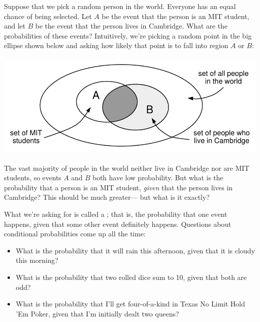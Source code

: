 \begin{problems}
\classproblems
{}
\end{problems}


Suppose that we pick a random person in the world.  Everyone has an
equal chance of being selected.  Let $A$ be the event that the person
is an MIT student, and let $B$ be the event that the person lives in
Cambridge.  What are the probabilities of these events?  Intuitively,
we're picking a random point in the big ellipse shown below and asking
how likely that point is to fall into region $A$ or $B$:
%
\begin{center}
\includegraphics[height=2in]{figures/cambridge-conditional}
\end{center}
%
The vast majority of people in the world neither live in Cambridge nor
are MIT students, so events $A$ and $B$ both have low probability.
But what is the probability that a person is an MIT student,
\textit{given} that the person lives in Cambridge?  This should be
much greater--- but what is it exactly?

What we're asking for is called a ; that
is, the probability that one event happens, given that some other
event definitely happens.  Questions about conditional probabilities
come up all the time:
%
\begin{itemize}
\item What is the probability that it will rain this afternoon, given
that it is cloudy this morning?
\item What is the probability that two rolled dice sum to 10, given
that both are odd?
\item What is the probability that I'll get four-of-a-kind in Texas No
Limit Hold 'Em Poker, given that I'm initially dealt two queens?
\end{itemize}

